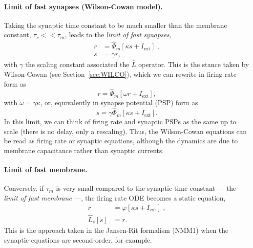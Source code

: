 \documentclass[12pt]{article}
\numberwithin{equation}{section}
\begin{document}
\paragraph{Limit of fast synapses (Wilson-Cowan model).} Taking the synaptic time constant to be much smaller than the membrane constant,  $\tau_s<< \tau_m$, leads to the \textit{limit of fast synapses, }
\begin{equation}\label{eq:wilco0}
\begin{aligned}
r &=  \hat \Phi_m [\kappa s +  I_\text{ext}] \;,\\
 s &= \gamma r,
 \end{aligned}
\end{equation}
with $\gamma$ the scaling constant associated the $\hat L$ operator. This is the stance taken by Wilson-Cowan (see  Section~\ref{sec:WILCO}), which we can rewrite in firing rate form as 
\begin{equation}\label{eq:wilco0-op}
 r =  \hat \Phi_m [\omega r +  I_\text{ext}] ,
\end{equation}
with $\omega= \gamma \kappa$, or, equivalently in synapse potential (PSP) form as
\begin{equation}\label{eq:wilco0-op-s}
 s =  \gamma \hat \Phi_m [\kappa s +  I_\text{ext}].
\end{equation}
In this limit, we can think of firing rate and synaptic PSPs as the same up to scale (there is no delay, only a rescaling). Thus, the Wilson-Cowan equations can be read as firing rate or synaptic equations, although the dynamics are due to membrane capacitance rather than synaptic currents.


 \paragraph{Limit of fast membrane.} Conversely, if $\tau_m$ is very small compared to the synaptic time constant --- the \textit{limit of fast membrane} ---, the firing rate ODE becomes a static equation,
\begin{equation}
\begin{aligned}
 r  &=  \varphi[\kappa s +  I_\text{ext}] \;,\\
 \hat L_s[s] &=  r.
 \end{aligned}
\end{equation}
This is the approach taken in the Jansen-Rit formalism (NMM1) when the synaptic equations are second-order, for example.
\end{document}
